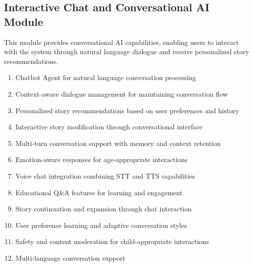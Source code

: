 \subsection{Interactive Chat and Conversational AI Module}
This module provides conversational AI capabilities, enabling users to interact with the system through natural language dialogue and receive personalized story recommendations.
\begin{enumerate}
    \item Chatbot Agent for natural language conversation processing
    \item Context-aware dialogue management for maintaining conversation flow
    \item Personalized story recommendations based on user preferences and history
    \item Interactive story modification through conversational interface
    \item Multi-turn conversation support with memory and context retention
    \item Emotion-aware responses for age-appropriate interactions
    \item Voice chat integration combining STT and TTS capabilities
    \item Educational Q\&A features for learning and engagement
    \item Story continuation and expansion through chat interaction
    \item User preference learning and adaptive conversation styles
    \item Safety and content moderation for child-appropriate interactions
    \item Multi-language conversation support
\end{enumerate}


